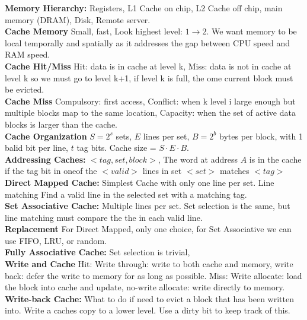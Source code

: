 \documentclass[answers,12pt,addpoints]{exam}
\begin{document}
\textbf{Memory Hierarchy:} Registers, L1 Cache on chip, L2 Cache off chip, main memory (DRAM), Disk, Remote server. \\
\textbf{Cache Memory} Small, fast, Look highest level: $1 \to 2$. We want memory to be local temporally and spatially as it addresses the gap between CPU speed and RAM speed. \\
\textbf{Cache Hit/Miss} Hit: data is in cache at level k, Miss: data is not in cache at level k so we must go to level k+1, if level k is full, the ome current block must be evicted. \\
\textbf{Cache Miss} Compulsory: first access, Conflict: when k level i large enough but multiple blocks map to the same location, Capacity: when the set of active data blocks is larger than the cache. \\
\textbf{Cache Organization} $S = 2^s$ sets, $E$ lines per set, $B = 2^b$ bytes per block, with 1 balid bit per line, $t$ tag bits. Cache size = $S \cdot E \cdot B$. \\
\textbf{Addressing Caches:} $<tag, set, block>$, The word at address $A$ is in the cache if the tag bit in oneof the $<valid>$ lines in set $<set>$ matches $<tag>$\\
\textbf{Direct Mapped Cache:} Simplest Cache with only one line per set. Line matching Find a valid line in the selected set with a matching tag. \\
\textbf{Set Associative Cache:} Multiple lines per set. Set selection is the same, but line matching  must compare the the in each valid line.\\
\textbf{Replacement} For Direct Mapped, only one choice, for Set Associative we can use FIFO, LRU, or random. \\
\textbf{Fully Associative Cache:} Set selection is trivial, \\
\textbf{Write and Cache} Hit: Write through: write to both cache and memory, write back: defer the write to memory for as long as possible. Miss: Write allocate: load the block into cache and update, no-write allocate: write directly to memory. \\
\textbf{Write-back Cache:} What to do if need to evict a block that has been written into. Write a caches copy to a lower level. Use a dirty bit to keep track of this. \\
\end{document}
